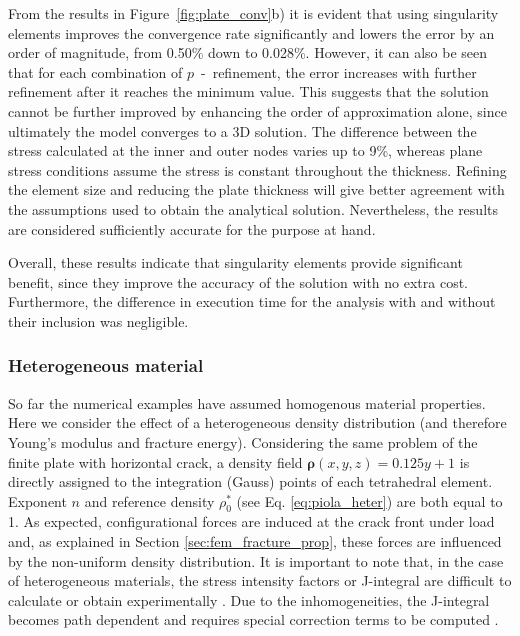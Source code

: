 \documentclass[onecolumn]{svjour3}
\begin{document}
From the results in Figure~\ref{fig:plate_conv}b) it is evident that using singularity elements improves the convergence rate significantly and lowers the error by an order of magnitude, from 0.50\% down to 0.028\%. 
However, it can also be seen that for each combination of $p$~-~refinement, the error increases with further refinement after it reaches the minimum value. 
This suggests that the solution cannot be further improved by enhancing the order of approximation alone, since ultimately the model converges to a 3D solution. The difference between the stress calculated at the inner and outer nodes varies up to 9\%, whereas plane stress conditions assume the stress is constant throughout the thickness. Refining the element size and reducing the plate thickness will give better agreement with the assumptions used to obtain the analytical solution. Nevertheless, the results are considered sufficiently accurate for the purpose at hand. 

Overall, these results indicate that singularity elements provide significant benefit, since they improve the accuracy of the solution with no extra cost.
Furthermore, the difference in execution time for the analysis with and without their inclusion was negligible. 

\subsubsection{Heterogeneous material}

So far the numerical examples have assumed homogenous material properties. Here we consider the effect of a heterogeneous density distribution (and therefore Young's modulus and fracture energy). 
Considering the same problem of the finite plate with horizontal crack, a density field $\mathbf{\rho}(x,y,z) = 0.125y + 1$ is directly assigned to the integration (Gauss) points of each tetrahedral element. Exponent $n$ and reference density $\rho_{0}^{\ast}$ (see Eq. \ref{eq:piola_heter}) are both equal to 1.
As expected, configurational forces are induced at the crack front under load and, as explained in Section \ref{sec:fem_fracture_prop}, these forces are influenced by the non-uniform density distribution. 
It is important to note that, in the case of heterogeneous materials, the stress intensity factors or J-integral are difficult to calculate or obtain experimentally \citep{fischer_problems_2014}. Due to the inhomogeneities, the J-integral becomes path dependent and requires special correction terms to be computed \citep{eischen_fracture_1987, chang_extension_2002}. 
\end{document}

